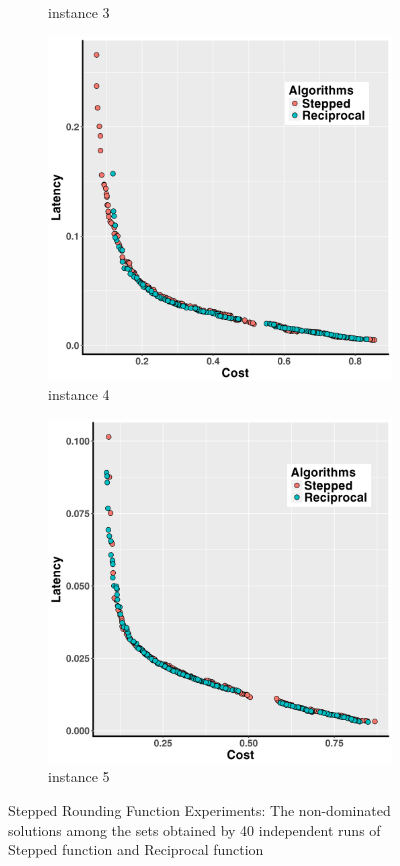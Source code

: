 \documentclass[10pt,journal,compsoc]{IEEEtran}
\begin{document}
\begin{figure}[h!]
\begin{subfigure}{0.49\linewidth}
    \caption{instance 3}
   \end{subfigure}
   \begin{subfigure}{0.49\linewidth}
       \includegraphics[width=\textwidth]{pics/transfer_problem4.png}
    \caption{instance 4}
   \end{subfigure}
   \begin{subfigure}{0.49\linewidth}
       \includegraphics[width=\textwidth]{pics/transfer_problem5.png}
    \caption{instance 5}
   \end{subfigure}
   \caption{Stepped Rounding Function Experiments: The non-dominated solutions among the sets obtained by 40 independent runs of Stepped function and Reciprocal
   function}
   \label{fig:transfer}
\end{figure}
\end{document}
